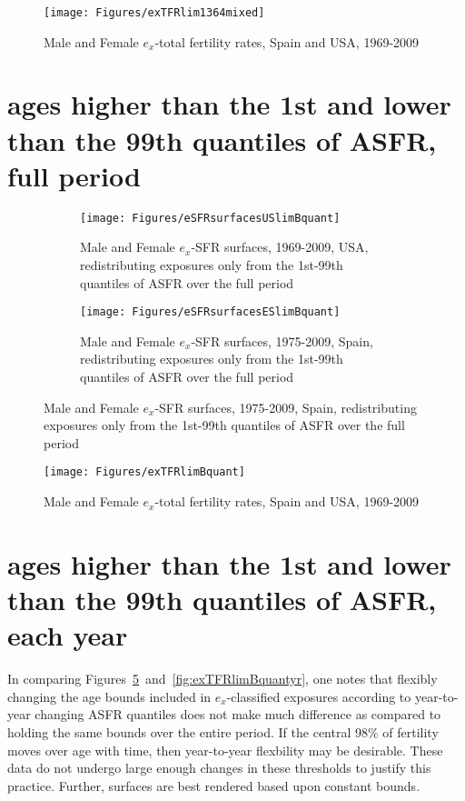 \begin{figure}[ht!]
        \centering  
          \caption{Male and Female $e_x$-total fertility rates, Spain
          and USA, 1969-2009}
           \texttt{[image: Figures/exTFRlim1364mixed]}
          \label{fig:exTFRlim13_64}
\end{figure}
\pagebreak
 \FloatBarrier
\section{ages higher than the 1st and lower than the 99th quantiles of ASFR,
full period}
\label{sec:quant}
\begin{figure}[ht!]
        \centering
        \begin{subfigure}
                \centering
                \caption{Male and Female $e_x$-SFR surfaces, 1969-2009, USA,
                redistributing exposures only from the 1st-99th quantiles of
                ASFR over the full period}
                \texttt{[image: Figures/eSFRsurfacesUSlimBquant]}
                \label{fig:exSFRsurfUSlimBquant}
        \end{subfigure}
        \begin{subfigure}
                \centering
                \caption{Male and Female $e_x$-SFR surfaces, 1975-2009, Spain,
                redistributing exposures only from the 1st-99th quantiles of
                ASFR over the full period}
                \texttt{[image: Figures/eSFRsurfacesESlimBquant]} 
                \label{fig:exSFRsurfESlimBquant}
        \end{subfigure}
\end{figure}

\begin{figure}[ht!]
        \centering  
          \caption{Male and Female $e_x$-total fertility rates, Spain
          and USA, 1969-2009}
           \texttt{[image: Figures/exTFRlimBquant]}
          \label{fig:exTFRlimBquant}
\end{figure}
\pagebreak
 \FloatBarrier
\section{ages higher than the 1st and lower than the 99th quantiles of ASFR,
each year}
\label{sec:quantan}
In comparing Figures~\ref{fig:exTFRlimBquant}~and~\ref{fig:exTFRlimBquantyr},
one notes that flexibly changing the age bounds included in $e_x$-classified
exposures according to year-to-year changing ASFR quantiles does not make much
difference as compared to holding the same bounds over the entire period. If
the central 98\% of fertility moves over age with time, then year-to-year
flexbility may be desirable. These data do not undergo large enough changes in
these thresholds to justify this practice. Further, surfaces are best rendered
based upon constant bounds.

